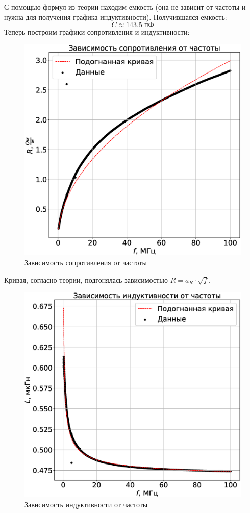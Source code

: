 \documentclass[a4paper,14pt]{extarticle}
\begin{document}
		С помощью формул из теории находим емкость (она не зависит от частоты и нужна для получения графика индуктивности). Получившаяся емкость:
		\begin{equation}
			C \approx 143.5 \; \text{пФ} 
		\end{equation}
		Теперь построим графики сопротивления и индуктивности:
		\newpage
		\begin{figure}[h!]
			\centering
			\includegraphics[width=.75\linewidth]{Lab3_4.eps}
			\caption{Зависимость сопротивления от частоты}
			\label{fig6}
		\end{figure}
		Кривая, согласно теории, подгонялась зависимостью $R = a_R \cdot \sqrt{f}$.
		\newpage
		\begin{figure}[h!]
			\centering
			\includegraphics[width=.75\linewidth]{Lab3_5.eps}
			\caption{Зависимость индуктивности от частоты}
			\label{fig7}
		\end{figure}
\end{document}
